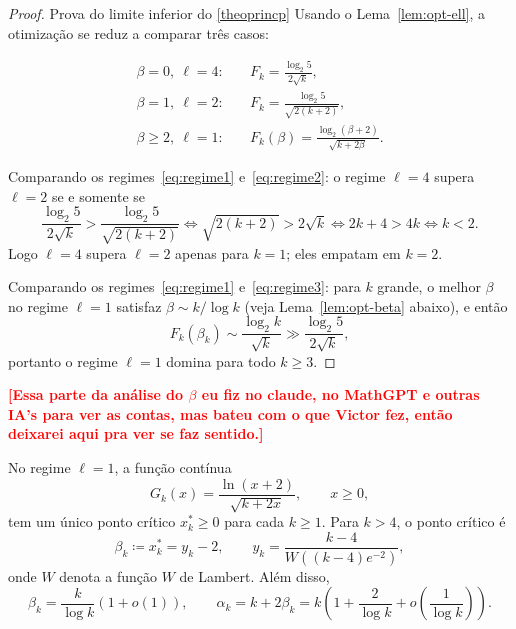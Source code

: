 \documentclass[reqno,a4paper,12pt]{amsart}
\newcommand{\afonso}[1]{\textcolor{red}{\textbf{[#1]}}}
\begin{document}
\begin{proof}{Prova do limite inferior do \ref{theoprincp}}
  Usando o Lema~\ref{lem:opt-ell}, a otimização se reduz a comparar três casos:

  \begin{align}
    \beta = 0,\ \ell = 4: \quad
     & F_k = \frac{\log_2 5}{2\sqrt{k}}, \label{eq:regime1}                     \\[4pt]
    \beta = 1,\ \ell = 2: \quad
     & F_k = \frac{\log_2 5}{\sqrt{2(k+2)}}, \label{eq:regime2}                 \\[4pt]
    \beta \geq 2,\ \ell = 1: \quad
     & F_k(\beta) = \frac{\log_2(\beta+2)}{\sqrt{k+2\beta}}. \label{eq:regime3}
  \end{align}

  Comparando os regimes~\eqref{eq:regime1} e~\eqref{eq:regime2}:
  o regime $\ell=4$ supera $\ell=2$ se e somente se
  \[
    \frac{\log_2 5}{2\sqrt{k}} > \frac{\log_2 5}{\sqrt{2(k+2)}}
    \iff
    \sqrt{2(k+2)} > 2\sqrt{k}
    \iff
    2k+4 > 4k
    \iff k < 2.
  \]
  Logo $\ell=4$ supera $\ell=2$ apenas para $k=1$; eles empatam em $k=2$.

  Comparando os regimes~\eqref{eq:regime1} e~\eqref{eq:regime3}:
  para $k$ grande, o melhor $\beta$ no regime $\ell=1$ satisfaz
  $\beta \sim k/\log k$ (veja Lema~\ref{lem:opt-beta} abaixo), e então
  \[
    F_k(\beta_k) \sim \frac{\log_2 k}{\sqrt{k}}
    \gg
    \frac{\log_2 5}{2\sqrt{k}},
  \]
  portanto o regime $\ell=1$ domina para todo $k \geq 3$.





\end{proof}

\afonso{Essa parte da análise do $\beta$ eu fiz no claude, no MathGPT e outras IA's para ver as contas, mas bateu com o que Victor fez, então deixarei aqui pra ver se faz sentido.}
\begin{lemma}\label{lem:opt-beta}
  No regime $\ell = 1$, a função contínua
  \[
    G_k(x) = \frac{\ln(x+2)}{\sqrt{k+2x}}, \qquad x \geq 0,
  \]
  tem um único ponto crítico $x_k^* \geq 0$ para cada $k \geq 1$.
  Para $k > 4$, o ponto crítico é
  \[
    \beta_k \coloneqq x_k^* = y_k - 2,
    \qquad
    y_k = \frac{k-4}{W\!\left((k-4)e^{-2}\right)},
  \]
  onde $W$ denota a função $W$ de Lambert.
  Além disso,
  \[
    \beta_k = \frac{k}{\log k}(1+o(1)),
    \qquad
    \alpha_k = k + 2\beta_k = k\!\left(1 + \frac{2}{\log k} + o\!\left(\frac{1}{\log k}\right)\right).
  \]
\end{lemma}
\end{document}
